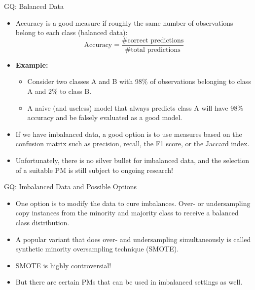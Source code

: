 \documentclass[11pt,compress,t,notes=noshow, aspectratio=169, xcolor=table]{beamer}
\begin{document}
\begin{frame}{GQ: Balanced Data}
    \begin{itemize}
        \item Accuracy is a good measure if roughly the same number of observations belong to each class (balanced data):
            $$
                \text{Accuracy} = \frac{\text{\# correct predictions}}{\text{\# total predictions}}
            $$
        \item \textbf{Example:} 
        \begin{itemize}
            \item Consider two classes A and B with 98\% of observations belonging to class A and 2\% to class B.
            \item A naive (and useless) model that always predicts class A will have 98\% accuracy and be falsely evaluated as a good model.
        \end{itemize}
        \item If we have imbalanced data, a good option is to use measures based on the confusion matrix such as precision, recall, the F1 score, or the Jaccard index.
        \item Unfortunately, there is no silver bullet for imbalanced data, and the selection of a suitable PM is still subject to ongoing research!
    \end{itemize}
\end{frame}

\begin{frame}{GQ: Imbalanced Data and Possible Options}
    \begin{itemize}
        \item One option is to modify the data to cure imbalances. Over- or undersampling copy instances from the minority and majority class to receive a balanced class distribution.
        \item A popular variant that does over- and undersampling simultaneously is called synthetic minority oversampling technique (SMOTE).
        \item SMOTE is highly controversial!
        \item But there are certain PMs that can be used in imbalanced settings as well.
    \end{itemize}
\end{frame}
\end{document}

